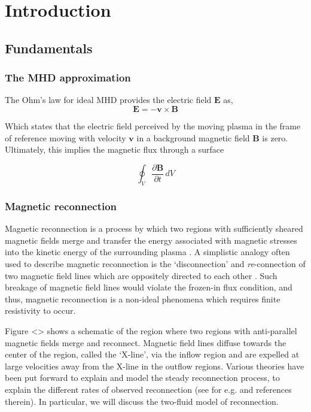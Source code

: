 \chapter{Introduction}

\section{Fundamentals}


\subsection{The MHD approximation}


The Ohm's law for ideal MHD provides the electric field $\mathbf{E}$ as,
\begin{equation}
    \mathbf{E} = -\mathbf{v} \times \mathbf{B}
\end{equation}

Which states that the electric field perceived by the moving plasma in the frame of reference moving with velocity $\mathbf{v}$ in a background magnetic field $\mathbf{B}$ is zero. Ultimately, this implies the magnetic flux through a surface 

\begin{equation}
    \oint_V \frac{\partial \mathbf{B}}{\partial t} \,dV
\end{equation}

\subsection{Magnetic reconnection}
Magnetic reconnection is a process by which two regions with sufficiently sheared magnetic fields merge and transfer the energy associated with magnetic stresses into the kinetic energy of the surrounding plasma \cite{Priest2000MagneticReconnection,Yamada2010MagneticReconnection}. A simplistic analogy often used to describe magnetic reconnection is the `disconnection' and \emph{re}-connection of two magnetic field lines which are oppositely directed to each other \cite{Gonzalez2016FundamentalReconnection}. Such breakage of magnetic field lines would violate the frozen-in flux condition, and thus, magnetic reconnection is a non-ideal phenomena which requires finite resistivity to occur. 

Figure <> shows a schematic of the region where two regions with anti-parallel magnetic fields merge and reconnect. Magnetic field lines diffuse towards the center of the region, called the `X-line', via the inflow region and are expelled at large velocities away from the X-line in the outflow regions. Various theories have been put forward to explain and model the steady reconnection process, to explain the different rates of observed reconnection (see for e.g.  and references therein). In particular, we will discuss the two-fluid model of reconnection. 

